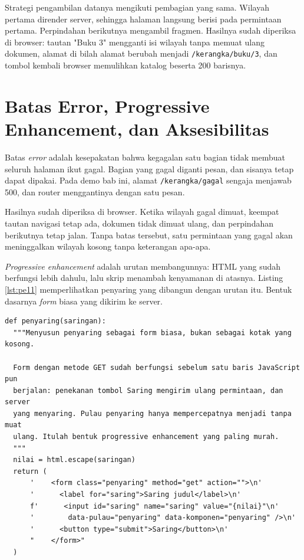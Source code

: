 Strategi pengambilan datanya mengikuti pembagian yang sama. Wilayah pertama
dirender server, sehingga halaman langsung berisi pada permintaan pertama.
Perpindahan berikutnya mengambil fragmen. Hasilnya sudah diperiksa di
browser: tautan "Buku 3" mengganti isi wilayah tanpa memuat ulang dokumen,
alamat di bilah alamat berubah menjadi \texttt{/kerangka/buku/3}, dan tombol
kembali browser memulihkan katalog beserta 200 barisnya.

\section{Batas Error, Progressive Enhancement, dan Aksesibilitas}

Batas \textit{error} adalah kesepakatan bahwa kegagalan satu bagian tidak
membuat seluruh halaman ikut gagal. Bagian yang gagal diganti pesan, dan sisanya
tetap dapat dipakai. Pada demo bab ini, alamat \texttt{/kerangka/gagal}
sengaja menjawab 500, dan router menggantinya dengan satu pesan.

Hasilnya sudah diperiksa di browser. Ketika wilayah gagal dimuat, keempat
tautan navigasi tetap ada, dokumen tidak dimuat ulang, dan perpindahan
berikutnya tetap jalan. Tanpa batas tersebut, satu permintaan yang gagal akan
meninggalkan wilayah kosong tanpa keterangan apa-apa.

\textit{Progressive enhancement} adalah urutan membangunnya: HTML yang sudah
berfungsi lebih dahulu, lalu skrip menambah kenyamanan di atasnya. Listing
\ref{lst:pe11} memperlihatkan penyaring yang dibangun dengan urutan itu.
Bentuk dasarnya \textit{form} biasa yang dikirim ke server.

\begin{lstlisting}[style=PythonStyle, caption={Penyaring sebagai form yang sudah jalan tanpa skrip, tersedia di \berkas{sources/chapter11/komponen.py}}, label={lst:pe11}]
def penyaring(saringan):
  """Menyusun penyaring sebagai form biasa, bukan sebagai kotak yang kosong.

  Form dengan metode GET sudah berfungsi sebelum satu baris JavaScript pun
  berjalan: penekanan tombol Saring mengirim ulang permintaan, dan server
  yang menyaring. Pulau penyaring hanya mempercepatnya menjadi tanpa muat
  ulang. Itulah bentuk progressive enhancement yang paling murah.
  """
  nilai = html.escape(saringan)
  return (
      '    <form class="penyaring" method="get" action="">\n'
      '      <label for="saring">Saring judul</label>\n'
      f'      <input id="saring" name="saring" value="{nilai}"\n'
      '        data-pulau="penyaring" data-komponen="penyaring" />\n'
      '      <button type="submit">Saring</button>\n'
      "    </form>"
  )
\end{lstlisting}

